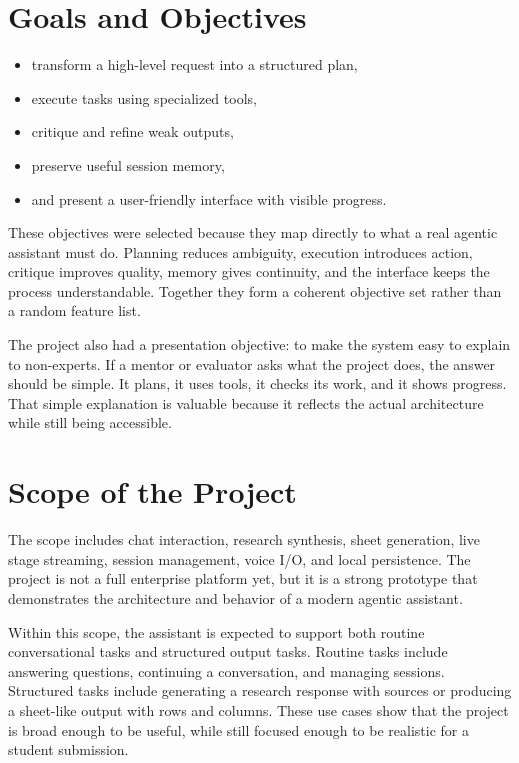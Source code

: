 \documentclass[11pt,oneside]{report}
\begin{document}
\section{Goals and Objectives}
\begin{itemize}[leftmargin=1.2cm]
  \item transform a high-level request into a structured plan,
  \item execute tasks using specialized tools,
  \item critique and refine weak outputs,
  \item preserve useful session memory,
  \item and present a user-friendly interface with visible progress.
\end{itemize}

These objectives were selected because they map directly to what a real agentic assistant must do. Planning reduces ambiguity, execution introduces action, critique improves quality, memory gives continuity, and the interface keeps the process understandable. Together they form a coherent objective set rather than a random feature list.

The project also had a presentation objective: to make the system easy to explain to non-experts. If a mentor or evaluator asks what the project does, the answer should be simple. It plans, it uses tools, it checks its work, and it shows progress. That simple explanation is valuable because it reflects the actual architecture while still being accessible.

\section{Scope of the Project}
The scope includes chat interaction, research synthesis, sheet generation, live stage streaming, session management, voice I/O, and local persistence. The project is not a full enterprise platform yet, but it is a strong prototype that demonstrates the architecture and behavior of a modern agentic assistant.

Within this scope, the assistant is expected to support both routine conversational tasks and structured output tasks. Routine tasks include answering questions, continuing a conversation, and managing sessions. Structured tasks include generating a research response with sources or producing a sheet-like output with rows and columns. These use cases show that the project is broad enough to be useful, while still focused enough to be realistic for a student submission.
\end{document}
